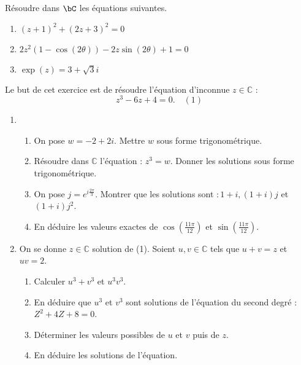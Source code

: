 \documentclass[a4paper, 11pt,reqno]{article}
\begin{document}
\vspace{1cm}
\begin{exercice}  \;
R\'esoudre dans $\bC$ les \'equations suivantes.
\begin{enumerate}
\item $(z+1)^2+(2z+3)^2=0$
\item $2z^2(1-\cos{(2\theta)})-2z\sin{(2\theta)}+1=0$
\item $\exp(z)=3+\sqrt{3}i$
\end{enumerate}
\end{exercice}
\vspace{1cm}
\begin{exercice}
Le but de cet exercice est de résoudre l'équation d'inconnue $z \in \mathbb{C}$ :
$$
z^{3}-6 z+4=0 . \quad (1)
$$
\begin{enumerate}
\item 
\begin{enumerate}
\item  On pose $w=-2+2 i$. Mettre $w$ sous forme trigonométrique.
\item Résoudre dans $\mathbb{C}$ l'équation : $z^{3}=w$. Donner les solutions sous forme trigonométrique.
\item  On pose $j=e^{i \frac{2 \pi}{3}}$. Montrer que les solutions sont $: 1+i,(1+i) j$ et $(1+i) j^{2}$.
\item En déduire les valeurs exactes de $\cos \left(\frac{11 \pi}{12}\right)$ et $\sin \left(\frac{11 \pi}{12}\right)$.
\end{enumerate}

\item 

On se donne $z \in \mathbb{C}$ solution de (1).
Soient $u, v \in \mathbb{C}$ tels que $u+v=z$ et $u v=2$.

\begin{enumerate}
\item  Calculer $u^{3}+v^{3}$ et $u^{3} v^{3}$.
\item  En déduire que $u^{3}$ et $v^{3}$ sont solutions de l'équation du second degré : $Z^{2}+4 Z+8=0$.
\item Déterminer les valeurs possibles de $u$ et $v$ puis de $z$.
\item En déduire les solutions de l'équation.
\end{enumerate}

\end{enumerate}

\end{exercice}
\end{document}
